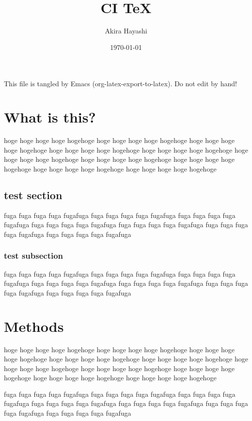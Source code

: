 \documentclass[11pt]{article}
\author{Akira Hayashi}
\date{\today}
\title{CI \TeX}
\begin{document}
\maketitle
\tableofcontents

This file is tangled by Emacs (org-latex-export-to-latex).
Do not edit by hand!
\section{What is this?}
\label{sec:org39af5bd}
hoge hoge hoge hoge hogehoge
hoge hoge hoge hoge hogehoge
hoge hoge hoge hoge hogehoge
hoge hoge hoge hoge hogehoge
hoge hoge hoge hoge hogehoge
hoge hoge hoge hoge hogehoge
hoge hoge hoge hoge hogehoge
hoge hoge hoge hoge hogehoge
hoge hoge hoge hoge hogehoge
hoge hoge hoge hoge hogehoge
\subsection{test section}
\label{sec:org3e47c6e}

fuga fuga fuga fuga fugafuga
fuga fuga fuga fuga fugafuga
fuga fuga fuga fuga fugafuga
fuga fuga fuga fuga fugafuga
fuga fuga fuga fuga fugafuga
fuga fuga fuga fuga fugafuga
fuga fuga fuga fuga fugafuga

\subsubsection{test subsection}
\label{sec:org9353144}

fuga fuga fuga fuga fugafuga
fuga fuga fuga fuga fugafuga
fuga fuga fuga fuga fugafuga
fuga fuga fuga fuga fugafuga
fuga fuga fuga fuga fugafuga
fuga fuga fuga fuga fugafuga
fuga fuga fuga fuga fugafuga

\section{Methods}
\label{sec:orga619c00}
hoge hoge hoge hoge hogehoge
hoge hoge hoge hoge hogehoge
hoge hoge hoge hoge hogehoge
hoge hoge hoge hoge hogehoge
hoge hoge hoge hoge hogehoge
hoge hoge hoge hoge hogehoge
hoge hoge hoge hoge hogehoge
hoge hoge hoge hoge hogehoge
hoge hoge hoge hoge hogehoge
hoge hoge hoge hoge hogehoge


fuga fuga fuga fuga fugafuga
fuga fuga fuga fuga fugafuga
fuga fuga fuga fuga fugafuga
fuga fuga fuga fuga fugafuga
fuga fuga fuga fuga fugafuga
fuga fuga fuga fuga fugafuga
fuga fuga fuga fuga fugafuga
\end{document}
